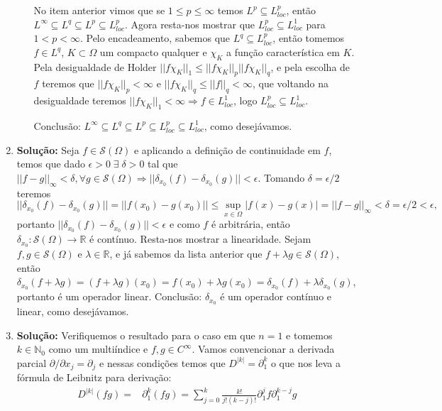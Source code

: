 \documentclass{article}
\begin{document}
\begin{enumerate}
\begin{enumerate}
			No item anterior vimos que se $1 \leq p \leq \infty$ temos $L^{p} \subseteq L^{p}_{loc}$, então $L^{\infty} \subseteq L^{q} \subseteq L^{p} \subseteq L^{p}_{loc}$. Agora resta-nos mostrar que $L^{p}_{loc} \subseteq L^{1}_{loc}$ para $1 < p < \infty$. Pelo encadeamento, sabemos que $L^{q}\subseteq L^{p}_{loc}$, então tomemos $f \in L^{q}$, $K \subset \Omega$ um compacto qualquer e $\chi_{K}$ a função característica em $K$. Pela desigualdade de Holder $||f\chi_{K}||_{1} \leq ||f\chi_{K}||_{p}||f\chi_{K}||_{q}$, e pela escolha de $f$ teremos que $||f\chi_{K}||_{p} < \infty$ e $||f\chi_{K}||_{q} \leq ||f||_{q} < \infty$, que voltando na desigualdade teremos $||f\chi_{K}||_{1} < \infty \Rightarrow f \in L^{1}_{loc}$, logo $L^{p}_{loc} \subseteq L^{1}_{loc}$. 
			
			Conclusão: $L^{\infty} \subseteq L^{q} \subseteq L^{p} \subseteq L^{p}_{loc} \subseteq L^{1}_{loc}$, como desejávamos.
		\end{enumerate}
		
		\item \textbf{Solução:} Seja $f \in \mathcal{S}(\Omega)$ e aplicando a definição de continuidade em $f$, temos que dado $\epsilon >0 \; \exists \; \delta >0$ tal que $||f - g||_{\infty} < \delta, \forall g \in \mathcal{S}(\Omega) \Rightarrow ||\delta_{x_0}(f) - \delta_{x_0}(g)|| < \epsilon$. Tomando $\delta = \epsilon/2$ teremos $$
		||\delta_{x_0}(f) - \delta_{x_0}(g)|| = ||f(x_{0}) - g(x_{0})|| \leq \sup_{x \in \Omega}|f(x) -g(x)| = ||f-g||_{\infty} < \delta = \epsilon/2 < \epsilon,
		$$ 
		portanto $||\delta_{x_0}(f) - \delta_{x_0}(g)||<\epsilon$ e como $f$ é arbitrária, então $\delta_{x_{0}} : \mathcal{S}(\Omega) \to \mathbb{R}$ é contínuo. Resta-nos mostrar a linearidade. Sejam $f, g \in \mathcal{S}(\Omega)$ e $\lambda \in \mathbb{R}$, e já sabemos da lista anterior que $f+\lambda g \in \mathcal{S}(\Omega)$, então $\delta_{x_{0}}(f+\lambda g) = (f+\lambda g)(x_{0}) = f(x_{0})+\lambda g(x_{0}) = \delta_{x_{0}}(f) + \lambda \delta_{x_{0}}(g)$, portanto é um operador linear. Conclusão: $\delta_{x_{0}}$ é um operador contínuo e linear, como desejávamos.
		
		\item \textbf{Solução:} Verifiquemos o resultado para o caso em que $n =1$ e tomemos $k \in \mathbb{N}_{0}$ como um multiíndice e $f, g \in C^{\infty}$. Vamos convencionar a derivada parcial $\partial/\partial {x_{j}} = \partial_{j}$ e nessas condições temos que $D^{|k|} = \partial^{k}_{1}$ o que nos leva a fórmula de Leibnitz para derivação:
		$$
		\begin{aligned}
		D^{|k|} (fg)
		= & \partial^{k}_{1} (fg) = \sum_{j=0}^{k} \frac{k!}{j!(k-j)!}\partial_{1}^{j}f \partial_{1}^{k-j}g
		\end{aligned}
		$$
	\end{enumerate}
	
\end{document}
